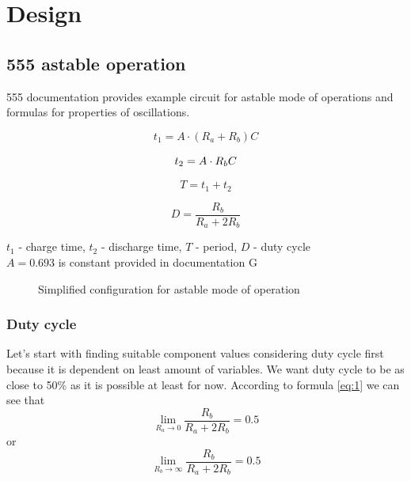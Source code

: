 \documentclass[english,10pt,a4paper]{article}
\begin{document}
	\section{Design}
	\subsection{555 astable operation}
	
	555 documentation provides example circuit for astable mode of operations and formulas for properties of oscillations.
	
	\begin{equation}\label{eq:1}
		t_1 = A \cdot (R_a + R_b) C
	\end{equation}
	
	\begin{equation}\label{eq:2}
		t_2 = A \cdot R_b \space C
	\end{equation}
	
	\begin{equation}\label{eq:3}
		T = t_1 + t_2 
	\end{equation}
	
	\begin{equation}\label{eq:4}
		D = \dfrac{R_b}{R_a + 2R_b}
	\end{equation}
	
	$t_1$ - charge time, $t_2$ - discharge time, $T$ - period, $D$ - duty cycle \\
	$A = 0.693$ is constant provided in documentation
	G
	\begin{figure}[H]
		\centering
		
		\caption{Simplified configuration for astable mode of operation}
	\end{figure}
	
	\subsubsection{Duty cycle}
	Let's start with finding suitable component values considering duty cycle first because it is dependent on least amount of variables.
	We want duty cycle to be as close to 50\% as it is possible at least for now. According to formula \ref{eq:1} we can see that
	\begin{equation}
		\lim_{R_a \to 0} \dfrac{R_b}{R_a + 2R_b} = 0.5
	\end{equation}
	or
	\begin{equation}
		\lim_{R_b \to \infty} \dfrac{R_b}{R_a + 2R_b} = 0.5
	\end{equation}
	
\end{document}
